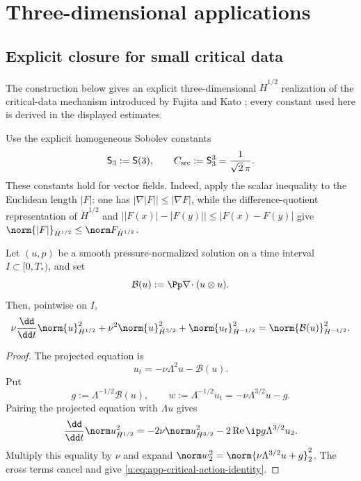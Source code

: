 \section{Three-dimensional applications}
\label{u:sec:three-dimensional-applications}

\subsection{Explicit closure for small critical data}

The construction below gives an explicit three-dimensional
\(\dot H^{1/2}\) realization of the critical-data mechanism introduced by
Fujita and Kato \cite{FujitaKato1964}; every constant used here is derived
in the displayed estimates.

Use the explicit homogeneous Sobolev constants
\[
 \mathsf S_3:=\mathsf S(3),
 \qquad
 C_{\rm src}:=\mathsf S_3^3=\frac1{\sqrt2\,\pi}.
\]
These constants hold for vector fields.  Indeed, apply the scalar
inequality to the Euclidean length \(|F|\): one has
\(|\nabla|F||\le|\nabla F|\), while the difference-quotient representation of
\(\dot H^{1/2}\) and
\(\bigl||F(x)|-|F(y)|\bigr|\le|F(x)-F(y)|\) give
\(\norm{|F|}_{\dot H^{1/2}}\le\norm F_{\dot H^{1/2}}\).

\begin{lemma}
\label{u:lem:app-critical-action-identity}
Let \((u,p)\) be a smooth pressure-normalized solution on a time interval
\(I\subset[0,T_*)\), and set
\[
 \mathcal B(u):=\Pp\nabla\!\cdot(u\otimes u).
\]
Then, pointwise on \(I\),
\begin{equation}
 \nu\frac{\dd}{\dd t}\norm{u}_{\dot H^{1/2}}^2
 +\nu^2\norm{u}_{\dot H^{3/2}}^2
 +\norm{u_t}_{\dot H^{-1/2}}^2
 =\norm{\mathcal B(u)}_{\dot H^{-1/2}}^2.
 \label{u:eq:app-critical-action-identity}
\end{equation}
\end{lemma}

\begin{proof}
The projected equation is
\[
 u_t=-\nu\Lambda^2u-\mathcal B(u).
\]
Put
\[
 g:=\Lambda^{-1/2}\mathcal B(u),
 \qquad
 w:=\Lambda^{-1/2}u_t=-\nu\Lambda^{3/2}u-g.
\]
Pairing the projected equation with \(\Lambda u\) gives
\[
 \frac{\dd}{\dd t}\norm u_{\dot H^{1/2}}^2
 =-2\nu\norm u_{\dot H^{3/2}}^2
  -2\operatorname{Re}\ip g{\Lambda^{3/2}u}_2.
\]
Multiply this equality by \(\nu\) and expand
\(\norm w_2^2=\norm{\nu\Lambda^{3/2}u+g}_2^2\).
The cross terms cancel and give
\eqref{u:eq:app-critical-action-identity}.
\end{proof}


